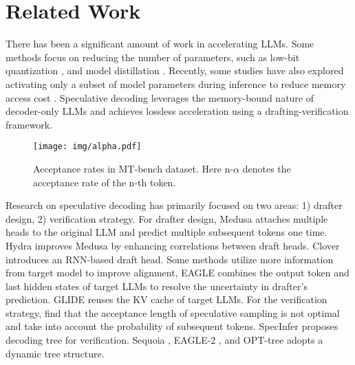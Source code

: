 \section{Related Work}
There has been a significant amount of work in accelerating LLMs. Some methods focus on reducing the number of parameters, such as low-bit quantization \cite{dettmers2022llmint88bitmatrixmultiplication, frantar2023gptqaccurateposttrainingquantization, DBLP:conf/icml/XiaoLSWDH23, DBLP:conf/mlsys/0002TTYCWXDG024}, and model distillation \cite{gu2024minillm, DBLP:conf/icml/KoKCY24, DBLP:conf/acl/Zhong00L0T24}. Recently, some studies have also explored activating only a subset of model parameters during inference to reduce memory access cost \cite{DBLP:conf/icml/DuHDTLXKZYFZFBZ22, DBLP:journals/jmlr/FedusZS22}. Speculative decoding \cite{chen2023acceleratinglargelanguagemodel, DBLP:conf/icml/LeviathanKM23} leverages the memory-bound nature of decoder-only LLMs and achieves lossless acceleration using a drafting-verification framework. 

\begin{figure}[t]
\centering
\setlength{\abovecaptionskip}{0.0cm}
\texttt{[image: img/alpha.pdf]}
\caption{Acceptance rates in MT-bench dataset. Here n-$\alpha$ denotes the acceptance rate of the n-th token.}
\label{fig:coral}
\end{figure}

Research on speculative decoding has primarily focused on two areas: 1) drafter design, 2) verification strategy. For drafter design, Medusa \cite{DBLP:conf/icml/CaiLGPLCD24} attaches multiple heads to the original LLM and predict multiple subsequent tokens one time. Hydra \cite{ankner2024hydrasequentiallydependentdraftheads} improves Medusa by enhancing correlations between draft heads. Clover \cite{DBLP:journals/corr/abs-2405-00263} introduces an RNN-based draft head. Some methods utilize more information from target model to improve alignment, EAGLE \cite{li2024eagle} combines the output token and last hidden states of target LLMs to resolve the uncertainty in drafter's prediction. GLIDE \cite{DBLP:conf/icml/Du0XWY0LXNTY24} reuses the KV cache of target LLMs. For the verification strategy,  \citet{hu2024accelerated, sun2024blockverificationacceleratesspeculative} find that the acceptance length of speculative sampling is not optimal and take into account the probability of subsequent tokens. SpecInfer \cite{DBLP:conf/asplos/MiaoOZCWZWZYSSC24} proposes decoding tree for verification. Sequoia \cite{chen2024sequoiascalablerobusthardwareaware}, EAGLE-2 \cite{li2024eagle2}, and OPT-tree \cite{wang2024opttreespeculativedecodingadaptive} adopts a dynamic tree structure.